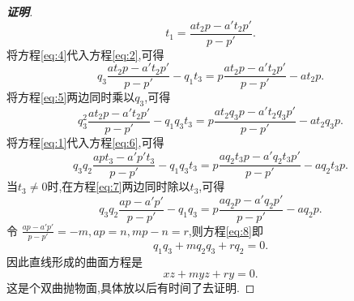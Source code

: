 \documentclass[a4paper]{article}
\begin{document}
\begin{proof}[\textbf{证明}]
\begin{equation}
  \label{eq:4}
  t_1=\frac{at_2p-a't_2p'}{p-p'}.
\end{equation}
将方程\eqref{eq:4}代入方程\eqref{eq:2},可得
\begin{equation}
  \label{eq:5}
  q_3 \frac{at_2p-a't_2p'}{p-p'}-q_1t_3=p\frac{at_2p-a't_2p'}{p-p'} -at_2p.
\end{equation}
将方程\eqref{eq:5}两边同时乘以$q_3$,可得
\begin{equation}
  \label{eq:6}
  q_3^2\frac{at_2p-a't_2p'}{p-p'}-q_1q_3t_3=p \frac{at_2q_3p-a't_2q_3p'}{p-p'}-at_2q_3p.
\end{equation}
将方程\eqref{eq:1}代入方程\eqref{eq:6},可得
\begin{equation}
  \label{eq:7}
    q_3q_{2}\frac{apt_{3}-a'p't_{3}}{p-p'}-q_1q_3t_3=p \frac{aq_{2}t_{3}p-a'q_{2}t_{3}p'}{p-p'}-aq_{2}t_3p.
\end{equation}
当$t_3\neq 0$时,在方程\eqref{eq:7}两边同时除以$t_3$,可得
\begin{equation}
  \label{eq:8}
      q_3q_{2}\frac{ap-a'p'}{p-p'}-q_1q_3=p \frac{aq_{2}p-a'q_{2}p'}{p-p'}-aq_{2}p.
\end{equation}
令 $\frac{ap-a'p'}{p-p'}=-m,ap=n,mp-n=r$,则方程\eqref{eq:8}即
\begin{equation}
  \label{eq:9}
  q_1q_3+mq_{2}q_{3}+rq_2=0.
\end{equation}
因此直线形成的曲面方程是
\begin{equation}
  \label{eq:10}
  xz+myz+ry=0.
\end{equation}
这是个双曲抛物面,具体放以后有时间了去证明.
\end{proof}
\end{document}
